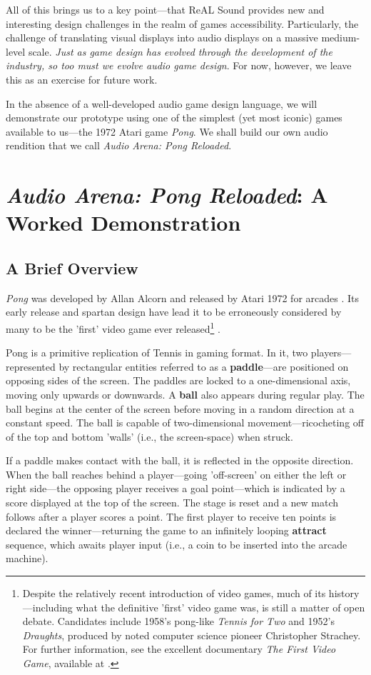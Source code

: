 \documentclass{report}
\newcommand{\rs}{ReAL Sound\xspace}
\newcommand{\state}[1]{\textbf{#1}}
\newcommand{\tech}[1]{\textbf{#1}}
\begin{document}
All of this brings us to a key point---that \rs provides new and interesting design challenges in the realm of games accessibility. Particularly, the challenge of translating visual displays into audio displays on a massive medium-level scale. \emph{Just as game design has evolved through the development of the industry, so too must we evolve audio game design}. For now, however, we leave this as an exercise for future work.

In the absence of a well-developed audio game design language, we will demonstrate our prototype using one of the simplest (yet most iconic) games available to us---the 1972 Atari game \emph{Pong}. We shall build our own audio rendition that we call \emph{Audio Arena: Pong Reloaded}.

\section{\emph{Audio Arena: Pong Reloaded}: A Worked Demonstration}
\subsection{A Brief Overview}
\emph{Pong} was developed by Allan Alcorn and released by Atari 1972 for arcades \cite{o2015pillars}. Its early release and spartan design have lead it to be erroneously considered by many to be the 'first' video game ever released\footnote{Despite the relatively recent introduction of video games, much of its history---including what the definitive 'first' video game was, is still a matter of open debate. Candidates include 1958's pong-like \emph{Tennis for Two} \cite{de2015tennis} and 1952's \emph{Draughts}, produced by noted computer science pioneer Christopher Strachey. For further information, see the excellent documentary \emph{The First Video Game}, available at \cite{Ahoy_2019}.} \cite{raessens2011handbook}. 

Pong is a primitive replication of Tennis in gaming format. In it, two players---represented by rectangular entities referred to as a \tech{paddle}---are positioned on opposing sides of the screen. The paddles are locked to a one-dimensional axis, moving only upwards or downwards. A \tech{ball} also appears during regular play. The ball begins at the center of the screen before moving in a random direction at a constant speed. The ball is capable of two-dimensional movement---ricocheting off of the top and bottom 'walls' (i.e., the screen-space) when struck. 

If a paddle makes contact with the ball, it is reflected in the opposite direction. When the ball reaches behind a player---going 'off-screen' on either the left or right side---the opposing player receives a goal point---which is indicated by a score displayed at the top of the screen. The stage is reset and a new match follows after a player scores a point. The first player to receive ten points is declared the winner---returning the game to an infinitely looping \state{attract} sequence, which awaits player input (i.e., a coin to be inserted into the arcade machine).
\end{document}
